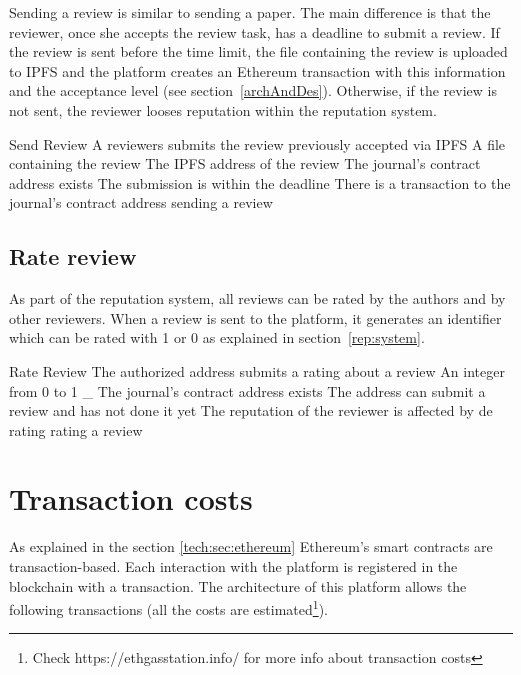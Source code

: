 Sending a review is similar to sending a paper. The main difference is that the
reviewer, once she accepts the review task, has a deadline to submit a review.
If the review is sent before the time limit, the file containing the review is
uploaded to IPFS and the platform creates an Ethereum transaction with this
information and the acceptance level (see section~\ref{archAndDes}). Otherwise,
if the review is not sent, the reviewer looses reputation within the reputation
system.

{Send Review}%
{A reviewers submits the review previously accepted via
  IPFS}%
{A file containing the review}%
{The IPFS address of the review}%
{The journal's contract address exists}%
{The submission is within the deadline}%
{There is a transaction to the journal's contract address}%
{sending a review}%

\subsection*{Rate review}

As part of the reputation system, all reviews can be rated by the authors and by
other reviewers. When a review is sent to the platform, it generates an
identifier which can be rated with 1 or 0 as explained in
section~\ref{rep:system}.

{Rate Review}%
{The authorized address submits a rating about a review}%
{An integer from 0 to 1}%
{_}%
{The journal's contract address exists}%
{The address can submit a review and has not done it yet}%
{The reputation of the reviewer is affected by de rating}%
{rating a review}%
\section{Transaction costs}
\label{arch:trans}

As explained in the section \ref{tech:sec:ethereum} Ethereum's smart contracts
are transaction-based. Each interaction with the platform is registered in the
blockchain with a transaction. The architecture of this platform allows the
following transactions (all the costs are estimated\footnote{Check
  https://ethgasstation.info/ for more info about transaction costs}).

